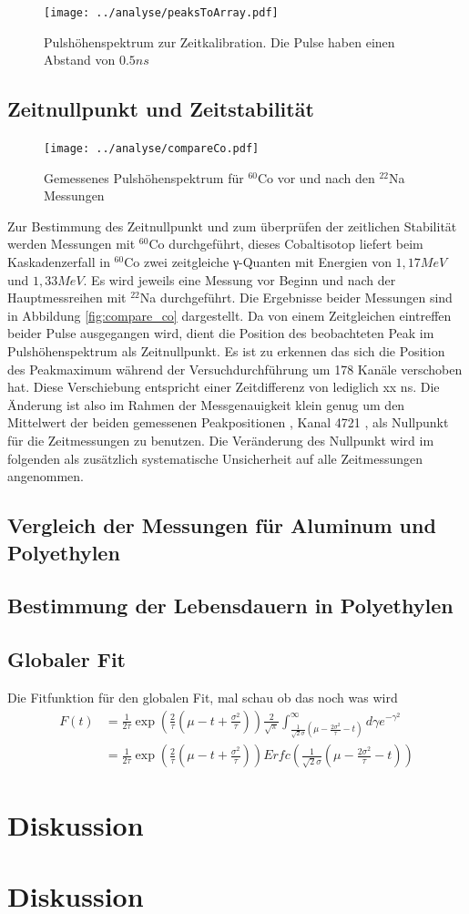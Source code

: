 \documentclass[a4paper,12pt]{article}
\begin{document}
		\begin{figure}
		\texttt{[image: ../analyse/peaksToArray.pdf]}
		\caption{Pulshöhenspektrum zur Zeitkalibration. Die Pulse haben einen Abstand von $0.5\si{ns}$}
		\label{fig:timepuls}
		\end{figure}
\subsection{Zeitnullpunkt und Zeitstabilität}
		\begin{figure}
		\texttt{[image: ../analyse/compareCo.pdf]}
		\caption{Gemessenes Pulshöhenspektrum für $^{60}$Co vor und nach den $^{22}$Na Messungen}
		\label{fig:timepuls}
		\end{figure}
		Zur Bestimmung des Zeitnullpunkt und zum überprüfen der zeitlichen Stabilität werden Messungen mit $^{60}$Co durchgeführt, dieses Cobaltisotop liefert 
		beim Kaskadenzerfall in $^{60}$Co zwei zeitgleiche γ-Quanten mit Energien von $1,17\si{MeV}$ und $1,33\si{MeV}$. Es wird jeweils eine Messung vor Beginn
		und nach der Hauptmessreihen mit $^{22}$Na durchgeführt. Die Ergebnisse beider Messungen sind in Abbildung \ref{fig:compare_co} dargestellt.
		Da von einem Zeitgleichen eintreffen beider Pulse ausgegangen wird, dient die Position des beobachteten Peak im Pulshöhenspektrum als Zeitnullpunkt. Es
		ist zu erkennen das sich die Position des Peakmaximum während der Versuchdurchführung um 178 Kanäle verschoben hat. Diese Verschiebung entspricht einer
		Zeitdifferenz von lediglich xx ns. Die Änderung ist also im Rahmen der Messgenauigkeit klein genug um den Mittelwert der
		beiden gemessenen Peakpositionen , Kanal 4721 , als Nullpunkt für die Zeitmessungen zu benutzen. Die Veränderung des Nullpunkt wird im folgenden
		als zusätzlich systematische Unsicherheit auf alle Zeitmessungen angenommen.  
\subsection{Vergleich der Messungen für Aluminum und Polyethylen}

\subsection{Bestimmung der Lebensdauern in Polyethylen}
		
\subsection{Globaler Fit}
Die Fitfunktion für den globalen Fit, mal schau ob das noch was wird
\begin{align*}
	F(t) &= \frac{1}{2τ} \exp\left( \frac{2}{τ}\left( μ-t+\frac{σ^2}{τ} \right) \right) \frac{2}{\sqrt{π}}\int_{\frac{1}{\sqrt{2}σ}\left( μ-\frac{2σ^2}{τ} -t \right)}^\infty dγ e^{-γ^2}\\
	&= \frac{1}{2τ} \exp\left( \frac{2}{τ}\left( μ-t+\frac{σ^2}{τ} \right) \right) Erfc\left(\frac{1}{\sqrt{2}σ}\left( μ-\frac{2σ^2}{τ} -t \right)\right)
\end{align*}
\section{Diskussion}

 
\section{Diskussion} 
\end{document}
